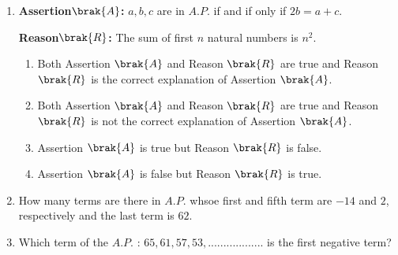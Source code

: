 \begin{enumerate}
\item
\textbf{Assertion$\brak{A}$:} $a,b,c$ are in $A.P.$ if and if only if $2b = a + c$.

\textbf{Reason$\brak{R}$:} The sum of first $n$ natural numbers is $n^2$.
\begin{enumerate}
\item Both Assertion $\brak{A}$ and Reason $\brak{R}$ are true and Reason $\brak{R}$ is the correct explanation of Assertion $\brak{A}$.
\item Both Assertion $\brak{A}$ and Reason $\brak{R}$ are true and Reason $\brak{R}$ is not the correct explanation of Assertion $\brak{A}$.
\item Assertion $\brak{A}$ is true but Reason $\brak{R}$ is false.
\item Assertion $\brak{A}$ is false but Reason $\brak{R}$ is true.
\end{enumerate}
\item
How many terms are there in $A.P.$ whsoe first and fifth term are $-14$ and $2$, respectively and the last term is $62$.
\item
Which term of the $A.P.$ : $65,61,57,53, ..................$ is the first negative term?
\end{enumerate}
